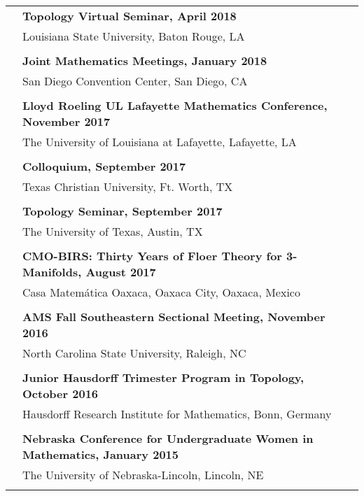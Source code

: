 \documentclass[letterpaper,11pt,oneside]{article}
\begin{document}
                  \begin{tabular}{@{} l l}
       & \textbf{Topology Virtual Seminar, April 2018 } \\
     & Louisiana State University, Baton Rouge, LA\\
     & \\
     &\textbf{Joint Mathematics Meetings, January 2018} \\
     &  San Diego Convention Center, San Diego, CA\\
     & \\
     &\textbf{Lloyd Roeling UL Lafayette Mathematics Conference, November 2017} \\
     &  The University of Louisiana at Lafayette, Lafayette, LA \\
     & \\

     &\textbf{Colloquium, September 2017} \\
     & Texas Christian University, Ft. Worth, TX \\
     & \\
     


     &\textbf{Topology Seminar, September 2017} \\
     &  The University of Texas, Austin, TX \\
     & \\
 

     &\textbf{CMO-BIRS: Thirty Years of Floer Theory for 3-Manifolds, August 2017 } \\
     &  Casa Matem\'{a}tica Oaxaca, Oaxaca City, Oaxaca, Mexico\\
     & \\
 

     &\textbf{AMS Fall Southeastern Sectional Meeting, November 2016 } \\
     &  North Carolina State University, Raleigh, NC \\
     & \\
     

     &\textbf{Junior Hausdorff Trimester Program in Topology, October 2016 } \\
     &  Hausdorff Research Institute for Mathematics, Bonn, Germany \\
     & \\

&\textbf{Nebraska Conference for Undergraduate Women in Mathematics, January 2015 } \\
     &  The University of Nebraska-Lincoln, Lincoln, NE \\
     & \\
     

\end{tabular}
\end{document}
